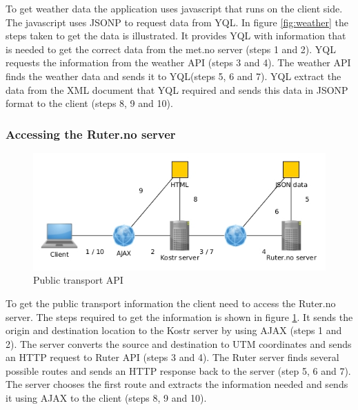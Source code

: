\documentclass[10pt,a4paper]{article}
\begin{document}
To get weather data the application uses javascript that runs on the client side. The javascript uses JSONP to request data from YQL. In figure \ref{fig:weather} the steps taken to get the data is illustrated. It provides YQL with information that is needed to get the correct data from the met.no server (steps 1 and 2). YQL requests the information from the weather API (steps 3 and 4). The weather API finds the weather data and sends it to YQL(steps 5, 6 and 7). YQL extract the data from the XML document that YQL required and sends this data in JSONP format to the client (steps 8, 9 and 10).

\subsubsection{Accessing the Ruter.no server}
\label{sec:access-publ-transp}
\begin{figure}
\centering
\includegraphics[width=\textwidth]{../ruter/access}
\caption{Public transport API}
\label{fig:public}
\end{figure}
To get the public transport information the client need to access the Ruter.no server. The steps required to get the information is shown in figure \ref{fig:public}. It sends the origin and destination location to the Kostr server by using AJAX (steps 1 and 2). The server converts the source and destination to UTM coordinates and sends an HTTP request to Ruter API (steps 3 and 4). The Ruter server finds several possible routes and sends an HTTP response back to the server (step 5, 6 and 7). The server chooses the first route and extracts the information needed and sends it using AJAX to the client (steps 8, 9 and 10).
\end{document}
